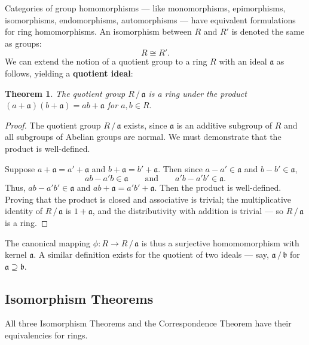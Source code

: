 \documentclass[11pt]{article}
\newtheorem{theorem}{Theorem}
\begin{document}
Categories of group homomorphisms --- like monomorphisms, epimorphisms, isomorphisms, endomorphisms, automorphisms --- have equivalent formulations for ring homomorphisms. An isomorphism between $R$ and $R'$ is denoted the same as groups:
\[
	R \cong R'.
\]
We can extend the notion of a quotient group to a ring $R$ with an ideal $\mathfrak{a}$ as follows, yielding a \textbf{quotient ideal}:

\begin{adjustwidth}{0.5cm}{}
	\begin{theorem}
		The quotient group $R \,/\, \mathfrak{a}$ is a ring under the product $(a + \mathfrak{a})(b + \mathfrak{a}) = ab + \mathfrak{a}$ for $a, b \in R$.
	\end{theorem}
	\begin{proof}
		The quotient group $R \,/\, \mathfrak{a}$ exists, since $\mathfrak{a}$ is an additive subgroup of $R$ and all subgroups of Abelian groups are normal. We must demonstrate that the product is well-defined.
		
		Suppose $a + \mathfrak{a} = a' + \mathfrak{a}$ and $b + \mathfrak{a} = b' + \mathfrak{a}$. Then since $a - a' \in \mathfrak{a}$ and $b - b' \in \mathfrak{a}$,
		\[
			ab - a'b \in \mathfrak{a} \qquad \text{and} \qquad a'b - a'b' \in \mathfrak{a}.
		\]
		Thus, $ab - a'b' \in \mathfrak{a}$ and $ab + \mathfrak{a} = a'b' + \mathfrak{a}$. Then the product is well-defined. Proving that the product is closed and associative is trivial; the multiplicative identity of $R \,/\, \mathfrak{a}$ is $1 + \mathfrak{a}$, and the distributivity with addition is trivial --- so $R \,/\, \mathfrak{a}$ is a ring.
	\end{proof}
\end{adjustwidth}

The canonical mapping $\phi : R \to R \,/\, \mathfrak{a}$ is thus a surjective homomomorphism with kernel $\mathfrak{a}$. A similar definition exists for the quotient of two ideals --- say, $\mathfrak{a} \,/\, \mathfrak{b}$ for $\mathfrak{a} \supseteq \mathfrak{b}$.

\newpage


\subsection{Isomorphism Theorems}

All three Isomorphism Theorems and the Correspondence Theorem have their equivalencies for rings.
\end{document}
